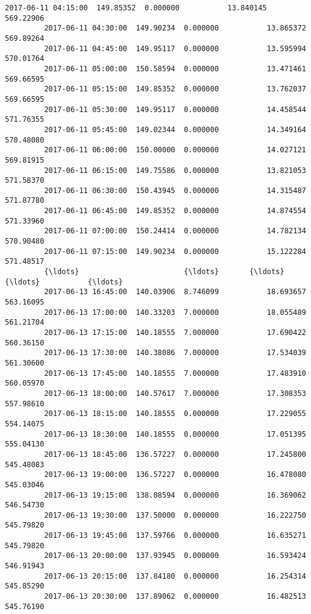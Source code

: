 \documentclass[11pt]{article}
\begin{document}
\begin{Verbatim}[commandchars=\\\{\}]
         2017-06-11 04:15:00  149.85352  0.000000           13.840145     569.22906   
         2017-06-11 04:30:00  149.90234  0.000000           13.865372     569.89264   
         2017-06-11 04:45:00  149.95117  0.000000           13.595994     570.01764   
         2017-06-11 05:00:00  150.58594  0.000000           13.471461     569.66595   
         2017-06-11 05:15:00  149.85352  0.000000           13.762037     569.66595   
         2017-06-11 05:30:00  149.95117  0.000000           14.458544     571.76355   
         2017-06-11 05:45:00  149.02344  0.000000           14.349164     570.48080   
         2017-06-11 06:00:00  150.00000  0.000000           14.027121     569.81915   
         2017-06-11 06:15:00  149.75586  0.000000           13.821053     571.58370   
         2017-06-11 06:30:00  150.43945  0.000000           14.315487     571.87780   
         2017-06-11 06:45:00  149.85352  0.000000           14.874554     571.33960   
         2017-06-11 07:00:00  150.24414  0.000000           14.782134     570.90480   
         2017-06-11 07:15:00  149.90234  0.000000           15.122284     571.48517   
         {\ldots}                        {\ldots}       {\ldots}                 {\ldots}           {\ldots}   
         2017-06-13 16:45:00  140.03906  8.746099           18.693657     563.16095   
         2017-06-13 17:00:00  140.33203  7.000000           18.055489     561.21704   
         2017-06-13 17:15:00  140.18555  7.000000           17.690422     560.36150   
         2017-06-13 17:30:00  140.38086  7.000000           17.534039     561.30600   
         2017-06-13 17:45:00  140.18555  7.000000           17.483910     560.05970   
         2017-06-13 18:00:00  140.57617  7.000000           17.308353     557.98610   
         2017-06-13 18:15:00  140.18555  0.000000           17.229055     554.14075   
         2017-06-13 18:30:00  140.18555  0.000000           17.051395     555.04130   
         2017-06-13 18:45:00  136.57227  0.000000           17.245800     545.48083   
         2017-06-13 19:00:00  136.57227  0.000000           16.478080     545.03046   
         2017-06-13 19:15:00  138.08594  0.000000           16.369062     546.54730   
         2017-06-13 19:30:00  137.50000  0.000000           16.222750     545.79820   
         2017-06-13 19:45:00  137.59766  0.000000           16.635271     545.79820   
         2017-06-13 20:00:00  137.93945  0.000000           16.593424     546.91943   
         2017-06-13 20:15:00  137.84180  0.000000           16.254314     545.85290   
         2017-06-13 20:30:00  137.89062  0.000000           16.482513     545.76190   

\end{Verbatim}
\end{document}

